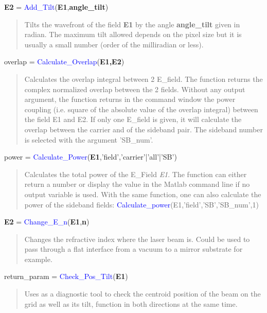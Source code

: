 \noindent \textbf{E2} = \textcolor{blue}{ Add\_Tilt}(\textbf{E1},\textbf{angle\_tilt})
\vspace*{-0.2cm}
\begin{quote}
Tilts the wavefront of the field \textbf{E1} by the angle \textbf{angle\_tilt} given in radian. The maximum tilt allowed depends on the pixel size but it is usually a small number (order of the milliradian or less).
\end{quote}

\noindent overlap = \textcolor{blue}{Calculate\_Overlap}(\textbf{E1,E2})
\vspace*{-0.2cm}
\begin{quote}
Calculates the overlap integral between 2 E\_field. The function returns the complex normalized overlap between the 2 fields. Without any output argument, the function returns in the command window the power coupling (i.e. square of the absolute value of the overlap integral) between the field E1 and E2.
If only one E\_field is given, it will calculate the overlap between the carrier and of the sideband pair. The sideband number is selected with the argument 'SB\_num'.
\end{quote}

\noindent power = \textcolor{blue}{Calculate\_Power}(\textbf{E1},'field','carrier'|'all'|'SB')
\vspace*{-0.2cm}
\begin{quote}
Calculates the total power of the E\_Field \textsl{E1}. The function can either return a number or display the value in the Matlab command line if no output variable is used. With the same function, one can also calculate the power of the sideband fields:
\textcolor{blue}{Calculate\_power}(E1,'field','SB','SB\_num',1)
\end{quote}

\noindent \textbf{E2} = \textcolor{blue}{Change\_E\_n}(\textbf{E1},\textbf{n})
\vspace*{-0.2cm}
\begin{quote}
Changes the refractive index where the laser beam is. Could be used to pass through a flat interface from a vacuum to a mirror substrate for example.
\end{quote}

\noindent return\_param = \textcolor{blue}{Check\_Pos\_Tilt}(\textbf{E1})
\vspace*{-0.2cm}
\begin{quote}
Uses as a diagnostic tool to check the centroid position of the beam on the grid as well as its tilt, function in both directions at the same time.
\end{quote}


